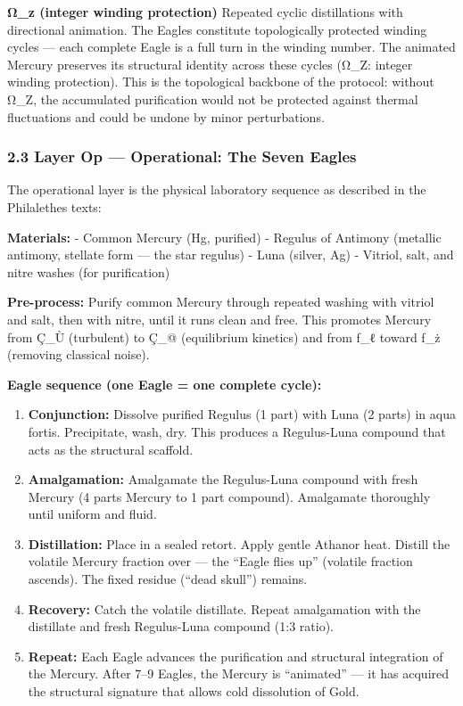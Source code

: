\textbf{Ω\_z (integer winding protection)} Repeated cyclic distillations
with directional animation. The Eagles constitute topologically
protected winding cycles --- each complete Eagle is a full turn in the
winding number. The animated Mercury preserves its structural identity
across these cycles (Ω\_Z: integer winding protection). This is the
topological backbone of the protocol: without Ω\_Z, the accumulated
purification would not be protected against thermal fluctuations and
could be undone by minor perturbations.

\subsubsection{2.3 Layer Op --- Operational: The Seven
Eagles}\label{layer-op-operational-the-seven-eagles}

The operational layer is the physical laboratory sequence as described
in the Philalethes texts:

\textbf{Materials:} - Common Mercury (Hg, purified) - Regulus of
Antimony (metallic antimony, stellate form --- the star regulus) - Luna
(silver, Ag) - Vitriol, salt, and nitre washes (for purification)

\textbf{Pre-process:} Purify common Mercury through repeated washing
with vitriol and salt, then with nitre, until it runs clean and free.
This promotes Mercury from Ç\_Ù (turbulent) to Ç\_@ (equilibrium
kinetics) and from ƒ\_ℓ toward ƒ\_ż (removing classical noise).

\textbf{Eagle sequence (one Eagle = one complete cycle):}

\begin{enumerate}
\def\labelenumi{\arabic{enumi}.}
\item
  \textbf{Conjunction:} Dissolve purified Regulus (1 part) with Luna (2
  parts) in aqua fortis. Precipitate, wash, dry. This produces a
  Regulus-Luna compound that acts as the structural scaffold.
\item
  \textbf{Amalgamation:} Amalgamate the Regulus-Luna compound with fresh
  Mercury (4 parts Mercury to 1 part compound). Amalgamate thoroughly
  until uniform and fluid.
\item
  \textbf{Distillation:} Place in a sealed retort. Apply gentle Athanor
  heat. Distill the volatile Mercury fraction over --- the ``Eagle flies
  up'' (volatile fraction ascends). The fixed residue (``dead skull'')
  remains.
\item
  \textbf{Recovery:} Catch the volatile distillate. Repeat amalgamation
  with the distillate and fresh Regulus-Luna compound (1:3 ratio).
\item
  \textbf{Repeat:} Each Eagle advances the purification and structural
  integration of the Mercury. After 7--9 Eagles, the Mercury is
  ``animated'' --- it has acquired the structural signature that allows
  cold dissolution of Gold.
\end{enumerate}

